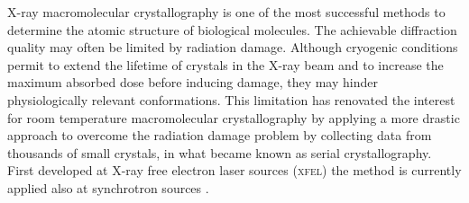 \documentclass[preprint]{iucr}              %
\begin{document}
X-ray macromolecular crystallography is one of the most successful methods to determine the atomic structure of biological molecules. 
The achievable diffraction quality may often be limited by radiation damage. 
Although cryogenic conditions permit to extend the lifetime of crystals in the X-ray beam and to increase the maximum absorbed dose before inducing damage, they may hinder physiologically relevant conformations. 
This limitation has renovated the interest for room temperature macromolecular crystallography by applying a more drastic approach to overcome the radiation damage problem by collecting data from thousands of small crystals, in what became known as serial crystallography. 
First developed at X-ray free electron laser sources (\textsc{xfel}) \cite{Chapman2011, structure_sx} the method is currently applied also at synchrotron sources \cite{ssx, ssx_desy, ssx_id13, ssx_diamond}.


\end{document}
